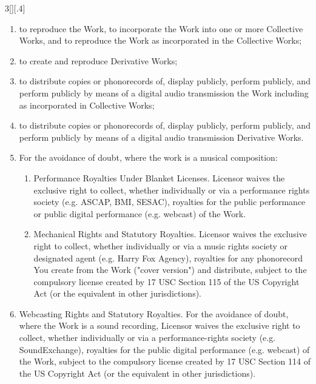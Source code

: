 \documentclass[8pt,a4paper]{article}
\begin{document}
\begin{multicols}{3}[][.4\paperwidth]
\begin{enumerate}
  \begin{enumerate}

  \item to reproduce the Work, to incorporate the Work into one or more
        Collective Works, and to reproduce the Work as incorporated in the
        Collective Works;
  \item to create and reproduce Derivative Works;
  \item to distribute copies or phonorecords of, display publicly, perform
        publicly, and perform publicly by means of a digital audio transmission
        the Work including as incorporated in Collective Works;
  \item to distribute copies or phonorecords of, display publicly, perform
        publicly, and perform publicly by means of a digital audio transmission
        Derivative Works.
  \item For the avoidance of doubt, where the work is a musical composition:

        \begin{enumerate}

        \item Performance Royalties Under Blanket Licenses. Licensor waives the
              exclusive right to collect, whether individually or via a
              performance rights society (e.g. ASCAP, BMI, SESAC), royalties for
              the public performance or public digital performance (e.g. webcast)
              of the Work.
        \item Mechanical Rights and Statutory Royalties. Licensor waives the
              exclusive right to collect, whether individually or via a music
              rights society or designated agent (e.g. Harry Fox Agency),
              royalties for any phonorecord You create from the Work ("cover
              version") and distribute, subject to the compulsory license created
              by 17 USC Section 115 of the US Copyright Act (or the equivalent in
              other jurisdictions).

       \end{enumerate}

  \item Webcasting Rights and Statutory Royalties. For the avoidance of doubt,
        where the Work is a sound recording, Licensor waives the exclusive right
        to collect, whether individually or via a performance-rights society
        (e.g. SoundExchange), royalties for the public digital performance (e.g.
        webcast) of the Work, subject to the compulsory license created by 17 USC
        Section 114 of the US Copyright Act (or the equivalent in other
        jurisdictions).


\end{enumerate}
\end{enumerate}
\end{multicols}
\end{document}
